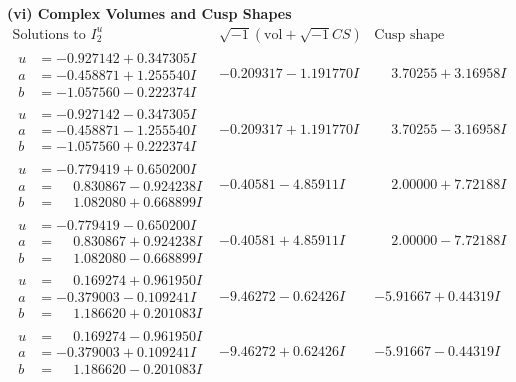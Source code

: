 \documentclass[1p]{elsarticle_modified}
\theoremstyle{definition}
\newcommand{\I}{\sqrt{-1}}
\begin{document}
\newpage\flushleft \textbf{(vi) Complex Volumes and Cusp Shapes}
$$\begin{array}{c|c|c}  
\text{Solutions to }I^u_{2}& \I (\text{vol} + \sqrt{-1}CS) & \text{Cusp shape}\\
 \hline 
\begin{aligned}
u &= -0.927142 + 0.347305 I \\
a &= -0.458871 + 1.255540 I \\
b &= -1.057560 - 0.222374 I\end{aligned}
 & -0.209317 - 1.191770 I & \phantom{-}3.70255 + 3.16958 I \\ \hline\begin{aligned}
u &= -0.927142 - 0.347305 I \\
a &= -0.458871 - 1.255540 I \\
b &= -1.057560 + 0.222374 I\end{aligned}
 & -0.209317 + 1.191770 I & \phantom{-}3.70255 - 3.16958 I \\ \hline\begin{aligned}
u &= -0.779419 + 0.650200 I \\
a &= \phantom{-}0.830867 - 0.924238 I \\
b &= \phantom{-}1.082080 + 0.668899 I\end{aligned}
 & -0.40581 - 4.85911 I & \phantom{-}2.00000 + 7.72188 I \\ \hline\begin{aligned}
u &= -0.779419 - 0.650200 I \\
a &= \phantom{-}0.830867 + 0.924238 I \\
b &= \phantom{-}1.082080 - 0.668899 I\end{aligned}
 & -0.40581 + 4.85911 I & \phantom{-}2.00000 - 7.72188 I \\ \hline\begin{aligned}
u &= \phantom{-}0.169274 + 0.961950 I \\
a &= -0.379003 - 0.109241 I \\
b &= \phantom{-}1.186620 + 0.201083 I\end{aligned}
 & -9.46272 - 0.62426 I & -5.91667 + 0.44319 I \\ \hline\begin{aligned}
u &= \phantom{-}0.169274 - 0.961950 I \\
a &= -0.379003 + 0.109241 I \\
b &= \phantom{-}1.186620 - 0.201083 I\end{aligned}
 & -9.46272 + 0.62426 I & -5.91667 - 0.44319 I \\ \hline\begin{aligned}

\end{aligned}
\end{array}$$
\end{document}
